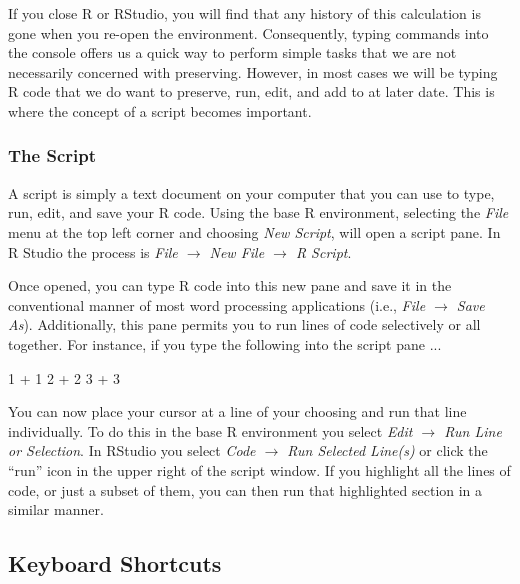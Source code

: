 \vspace{1em}

If you close R or RStudio, you will find that any history of this calculation is gone when you re-open the environment.  Consequently, typing commands into the console offers us a quick way to perform simple tasks that we are not necessarily concerned with preserving.  However, in most cases we will be typing R code that we do want to preserve, run, edit, and add to at later date.  This is where the concept of a \gls{script} becomes important.

\subsubsection{The Script}

A script is simply a text document on your computer that you can use to type, run, edit, and save your R code. Using the base R environment, selecting the \textit{File} menu at the top left corner and choosing \textit{New Script}, will open a script pane.  In R Studio the process is \textit{File $\rightarrow$ New File $\rightarrow$ R Script}.  

Once opened, you can type R code into this new pane and save it in the conventional manner of most word processing applications (i.e., \textit{File $\rightarrow$ Save As}). Additionally, this pane permits you to run lines of code selectively or all together. For instance, if you type the following into the script pane ...

\begin{inR}
1 + 1
2 + 2
3 + 3
\end{inR}

\medskip

You can now place your cursor at a line of your choosing and run that line individually.  To do this in the base R environment you select \textit{Edit $\rightarrow$ Run Line or Selection}.  In RStudio you select \textit{Code $\rightarrow$ Run Selected Line(s)} or click the ``run'' icon in the upper right of the script window. If you highlight all the lines of code, or just a subset of them, you can then run that highlighted section in a similar manner.

\subsection{Keyboard Shortcuts}
\label{sec:key_shortcuts}

